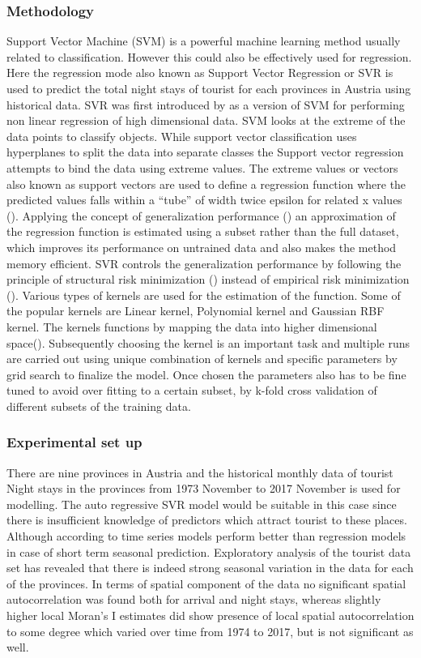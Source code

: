 \documentclass[a4paper,reqno,]{article}
\begin{document}
\subsubsection{Methodology}
Support Vector Machine (SVM) is a powerful machine learning method usually related to classification. However this could also be effectively used for regression. Here the regression mode also known as Support Vector Regression or SVR is used to predict the total night stays of tourist for each provinces in Austria using historical data.  SVR was first introduced by \cite{a} as a version of SVM for performing non linear regression of high dimensional data. SVM looks at the extreme of the data points to classify objects. While support vector classification uses hyperplanes to split the data into separate classes the Support vector regression attempts to bind the data using extreme values. The extreme values or vectors also known as support vectors are used to define a regression function where the predicted values falls within a “tube” of width twice epsilon for related x values (\cite{a}). Applying the concept of generalization performance (\cite{b}) an approximation of the regression function is estimated using a subset rather than the full dataset, which improves its performance on untrained data and also makes the method memory efficient. SVR controls the generalization performance by following the principle of structural risk minimization (\cite{d}) instead of empirical risk minimization (\cite{e}).  Various types of kernels are used for the estimation of the function. Some of the popular kernels are Linear kernel, Polynomial kernel and Gaussian RBF kernel. The kernels functions by mapping the data into higher dimensional space(\cite{c}). Subsequently choosing the kernel is an important task and multiple runs are carried out using unique combination of kernels and specific parameters by grid search to finalize the model. Once chosen the parameters also has to be fine tuned to avoid over fitting to a certain subset, by k-fold cross validation of different subsets of the training data.
\subsubsection{Experimental set up}
There are nine provinces in Austria and the historical monthly data of tourist Night stays in the provinces from 1973 November to 2017 November is used for modelling. The auto regressive SVR model would be suitable in this case since there is insufficient knowledge of predictors which attract tourist to these places. Although according to \cite{f} time series models perform better than regression models in case of short term seasonal prediction. 
Exploratory analysis of the tourist data set has revealed that there is indeed strong seasonal variation in the data for each of the provinces. In terms of spatial component of the data no significant spatial autocorrelation was found both for arrival and night stays, whereas slightly higher local Moran’s I estimates did show presence of local spatial autocorrelation to some degree which varied over time from 1974 to  2017, but is not significant as well.
\end{document}
